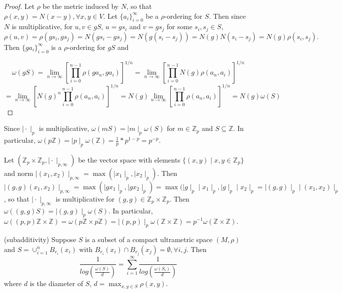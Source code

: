 \begin{proof}
Let $\rho$ be the metric induced by $N$, so that $\rho(x,y) = N(x-y), \forall x,y \in V$. Let $\{a_i\}_{i=0}^\infty$ be a $\rho$-ordering for $S$. Then since $N$ is multiplicative, for $u, v \in gS$, $u=gs_i$ and $v=gs_j$ for some $s_i, s_j \in S$,  $$\rho(u, v) = \rho(gs_i, gs_j) =N(gs_i - gs_j) = N(g(s_i - s_j)) = N(g)N(s_i - s_j) = N(g)\rho(s_i,s_j).$$
Then $\{ga_i\}_{i=0}^\infty$ is a $\rho$-ordering for $gS$ and 

 $$\omega(gS) = \lim_{n\to\infty} [\prod_{i=0}^{n-1} \rho(ga_n,ga_i)]^{1/n} 
 = \lim_{n\to\infty} [\prod_{i=0}^{n-1} N(g)\rho(a_n,a_i)]^{1/n} $$
 $$= \lim_{n\to\infty} [N(g)^n\prod_{i=0}^{n-1} \rho(a_n,a_i)]^{1/n} = N(g) \lim_{n\to\infty} [\prod_{i=0}^{n-1} \rho(a_n,a_i)]^{1/n} = N(g) \omega(S)$$
\end{proof}


\begin{example}
	Since $\mid \cdot \mid_p$ is multiplicative, $\omega(mS) = \mid m \mid_p  \omega(S)$ for $m \in \mathbb{Z}_p$ and $S \subseteq \mathbb{Z}$. In particular, $\omega(p\mathbb{Z}) = \mid p \mid_p \omega(\mathbb{Z}) = \frac{1}{p}*p^{1-p} = p^{-p}.$
\end{example}

\begin{example}
	Let $(\mathbb{Z}_p \times \mathbb{Z}_p, \mid \cdot \mid_{p,\infty})$ be the vector space with elements $\{(x,y)\mid x,y \in \mathbb{Z}_p\}$ and norm $ \mid (x_1,x_2) \mid_{p,\infty} = \max(\mid x_1 \mid_p,\mid x_2 \mid_p ).$ Then $\mid (g,g)(x_1,x_2) \mid_{p,\infty} = \max(\mid gx_1 \mid_p,\mid gx_2 \mid_p ) = \max(\mid g \mid_p \mid x_1 \mid_p,\mid g \mid_p \mid x_2 \mid_p=\mid (g,g) \mid_p \mid (x_1,x_2) \mid_p$, so that $\mid \cdot \mid_{p,\infty} $ is multiplicative for $(g,g) \in \mathbb{Z}_p \times \mathbb{Z}_p$. Then $\omega((g,g)S) = \mid (g,g) \mid_p\omega(S)$. In particular, $\omega((p,p)\mathbb{Z} \times \mathbb{Z}) =\omega(p\mathbb{Z} \times p\mathbb{Z})=\mid (p,p) \mid_p \omega(\mathbb{Z} \times \mathbb{Z}) =
	p^{-1} \omega(\mathbb{Z} \times \mathbb{Z}). $
	
\end{example}

\begin{proposition}
	(subadditivity) Suppose $S$ is a subset of a compact ultrametric space $(M, \rho)$ and $S = \cup_{i=1}^n B_{r_i}(x_i)$ with $ B_{r_i}(x_i) \cap B_{r_j}(x_j) = \emptyset, \forall i,j$. Then \[\frac{1}{log(\frac{\omega(S)}{d})} = \sum_{i=1}^\infty \frac{1}{log(\frac{\omega(S_i)}{d})}\] where $d$ is the diameter of $S$, $d=\max_{x,y \in S}\rho(x,y)$.
\end{proposition}

